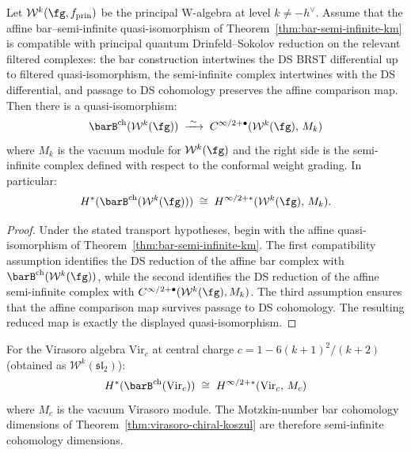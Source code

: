 \begin{theorem}[DS transport of bar = semi-infinite for principal \texorpdfstring{$\mathcal{W}$}{W}-algebras;
\ClaimStatusConditional]
\label{thm:bar-semi-infinite-w}
Let $\mathcal{W}^k(\fg, f_{\mathrm{prin}})$ be the principal
W-algebra at level $k \neq -h^\vee$. Assume that the affine
bar--semi-infinite quasi-isomorphism of
Theorem~\ref{thm:bar-semi-infinite-km} is compatible with principal
quantum Drinfeld--Sokolov reduction on the relevant filtered
complexes: the bar construction intertwines the DS BRST
differential up to filtered quasi-isomorphism, the semi-infinite
complex intertwines with the DS differential, and passage to DS
cohomology preserves the affine comparison map. Then there is a
quasi-isomorphism:
\begin{equation}\label{eq:bar-semi-infinite-w}
\barB^{\mathrm{ch}}(\mathcal{W}^k(\fg))
\;\xrightarrow{\;\sim\;}\;
C^{\infty/2+\bullet}(\mathcal{W}^k(\fg),\, M_k)
\end{equation}
where $M_k$ is the vacuum module for $\mathcal{W}^k(\fg)$ and the
right side is the semi-infinite complex defined with respect to the
conformal weight grading. In particular:
\[
H^*(\barB^{\mathrm{ch}}(\mathcal{W}^k(\fg)))
\;\cong\;
H^{\infty/2+*}(\mathcal{W}^k(\fg),\, M_k).
\]
\end{theorem}

\begin{proof}
Under the stated transport hypotheses, begin with the affine
quasi-isomorphism of Theorem~\ref{thm:bar-semi-infinite-km}. The
first compatibility assumption identifies the DS reduction of the
affine bar complex with
$\barB^{\mathrm{ch}}(\mathcal{W}^k(\fg))$, while the second
identifies the DS reduction of the affine semi-infinite complex with
$C^{\infty/2+\bullet}(\mathcal{W}^k(\fg), M_k)$. The third
assumption ensures that the affine comparison map survives passage to
DS cohomology. The resulting reduced map is exactly the displayed
quasi-isomorphism.
\end{proof}

\begin{corollary}[Virasoro bar complex = semi-infinite complex;
\ClaimStatusConditional]
\label{cor:virasoro-semi-infinite}
For the Virasoro algebra $\mathrm{Vir}_c$ at central charge
$c = 1 - 6(k+1)^2/(k+2)$ \textup{(}obtained as
$\mathcal{W}^k(\mathfrak{sl}_2)$\textup{)}:
\[
H^*(\barB^{\mathrm{ch}}(\mathrm{Vir}_c))
\;\cong\;
H^{\infty/2+*}(\mathrm{Vir}_c,\, M_c)
\]
where $M_c$ is the vacuum Virasoro module. The Motzkin-number
bar cohomology dimensions of
Theorem~\textup{\ref{thm:virasoro-chiral-koszul}} are therefore
semi-infinite cohomology dimensions.
\end{corollary}

